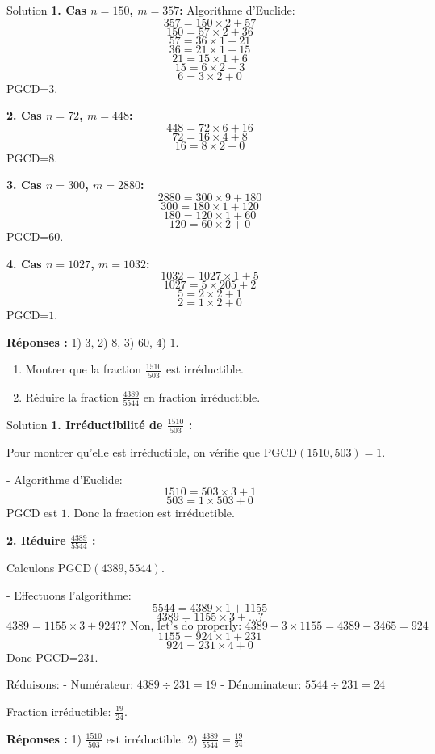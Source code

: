 \documentclass[a4paper,12pt]{article}
\begin{document}
\begin{solutionbox}{Solution}
\textbf{1. Cas $n=150$, $m=357$:}  
Algorithme d’Euclide:  
\[
357 = 150 \times 2 +57
\]
\[
150 = 57 \times 2 +36
\]
\[
57=36\times1+21
\]
\[
36=21\times1+15
\]
\[
21=15\times1+6
\]
\[
15=6\times2+3
\]
\[
6=3\times2+0
\]
PGCD=$3$.

\textbf{2. Cas $n=72$, $m=448$:}  
\[
448=72\times6+16
\]
\[
72=16\times4+8
\]
\[
16=8\times2+0
\]
PGCD=$8$.

\textbf{3. Cas $n=300$, $m=2880$:}  
\[
2880=300\times9+180
\]
\[
300=180\times1+120
\]
\[
180=120\times1+60
\]
\[
120=60\times2+0
\]
PGCD=$60$.

\textbf{4. Cas $n=1027$, $m=1032$:}  
\[
1032=1027\times1+5
\]
\[
1027=5\times205+2
\]
\[
5=2\times2+1
\]
\[
2=1\times2+0
\]
PGCD=$1$.

\textbf{Réponses :}
1) $3$, 2) $8$, 3) $60$, 4) $1$.
\end{solutionbox}

\begin{exercice}[title=Exercice 8 $\quad \star \quad$ { [Calculer] }]
\begin{enumerate}
    \item Montrer que la fraction $\frac{1510}{503}$ est irréductible.
    \item Réduire la fraction $\frac{4389}{5544}$ en fraction irréductible.
\end{enumerate}
\end{exercice}

\begin{solutionbox}{Solution}
\textbf{1. Irréductibilité de $\tfrac{1510}{503}$ :}

Pour montrer qu’elle est irréductible, on vérifie que $\mathrm{PGCD}(1510,503)=1$.

- Algorithme d’Euclide:
\[
1510=503\times3+1
\]
\[
503=1\times503+0
\]
PGCD est $1.$ Donc la fraction est irréductible.

\textbf{2. Réduire $\tfrac{4389}{5544}$ :}

Calculons $\mathrm{PGCD}(4389,5544)$.

- Effectuons l’algorithme:
\[
5544=4389\times1+1155
\]
\[
4389=1155\times3+ \dots?
\]
\[
4389=1155\times3+924?? \text{ Non, let's do properly: }4389-3\times1155=4389-3465=924
\]
\[
1155=924\times1+231
\]
\[
924=231\times4+0
\]
Donc PGCD=$231$.

Réduisons:
- Numérateur: $4389\div231=19$
- Dénominateur: $5544\div231=24$

Fraction irréductible: $\tfrac{19}{24}$.

\textbf{Réponses :}
1) $\tfrac{1510}{503}$ est irréductible.  
2) $\tfrac{4389}{5544} = \tfrac{19}{24}$.
\end{solutionbox}
\end{document}
